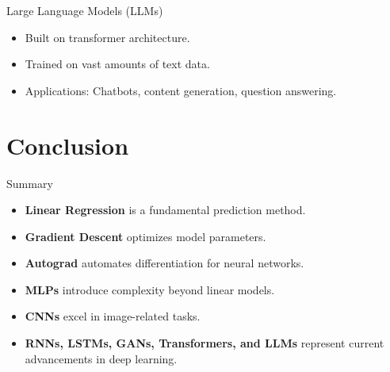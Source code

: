 \documentclass{beamer}
\begin{document}
\begin{frame}{Large Language Models (LLMs)}
    \begin{itemize}
        \item Built on transformer architecture.
        \item Trained on vast amounts of text data.
        \item Applications: Chatbots, content generation, question answering.
    \end{itemize}
\end{frame}

\section{Conclusion}
\begin{frame}{Summary}
    \begin{itemize}
        \item \textbf{Linear Regression} is a fundamental prediction method.
        \item \textbf{Gradient Descent} optimizes model parameters.
        \item \textbf{Autograd} automates differentiation for neural networks.
        \item \textbf{MLPs} introduce complexity beyond linear models.
        \item \textbf{CNNs} excel in image-related tasks.
        \item \textbf{RNNs, LSTMs, GANs, Transformers, and LLMs} represent current advancements in deep learning.
    \end{itemize}
\end{frame}
\end{document}
